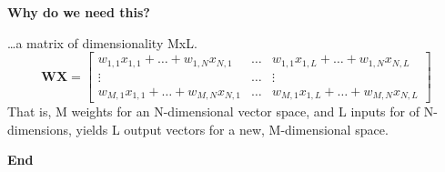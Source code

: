 \documentclass{beamer}
\newcommand{\placard}[1]{
  \begin{frame}
    \begin{center}
      \huge
      \textbf{#1}
    \end{center}
  \end{frame}
}
\newcommand{\pagestepalt}[2]{
  \begin{frame}[t]
    \begin{minipage}[t][0.26\textheight][t]{\textwidth}
      \begin{center}
        \huge
        \textbf{#1}
      \end{center}
    \end{minipage}
    
    \begin{minipage}[t][0.7\textheight][c]{\textwidth}
      #2
    \end{minipage}
  \end{frame}
}
\begin{document}
\pagestepalt{Why do we need this?}{
  \ldots a matrix of dimensionality MxL.
  \[
  \mathbf{WX} =
  \begin{bmatrix}
    w_{1,1}x_{1,1} + \ldots + w_{1,N}x_{N,1} & \ldots & w_{1,1}x_{1,L} + \ldots + w_{1,N}x_{N,L} \\ \vdots & \ldots & \vdots \\ w_{M,1}x_{1,1} + \ldots + w_{M,N}x_{N,1} & \ldots & w_{M,1}x_{1,L} + \ldots + w_{M,N}x_{N,L}
  \end{bmatrix}
  \]\pause
  That is, M weights for an N-dimensional vector space, and L inputs
  for of N-dimensions, yields L output vectors for a new, M-dimensional space.
}


\placard{End}
\end{document}
